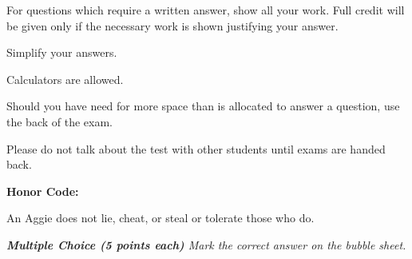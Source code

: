 \documentclass[11pt]{article}
\begin{document}
\Head
\begin{instructions}
\item For questions which require a written answer, show all your work.  Full credit will be given only if the necessary work is shown justifying your answer.
\item Simplify your answers.
\item Calculators are allowed.
\item Should you have need for more space than is allocated to answer a question, use the back of the exam.
\item Please do not talk about the test with other students until exams are handed back.
\item \textbf{Honor Code:}

\vspace{0.1in}
An Aggie does not lie, cheat, or steal or tolerate those who do.
\vspace{0.3in}

\par\noindent\makebox[2.5in]{\hrulefill} 
\par\noindent{}     
\end{instructions}
\newpage

\vspace{.2in}

\noindent \emph{{\bf Multiple Choice (5 points each)} Mark the correct
answer on the bubble sheet.}
\end{document}
